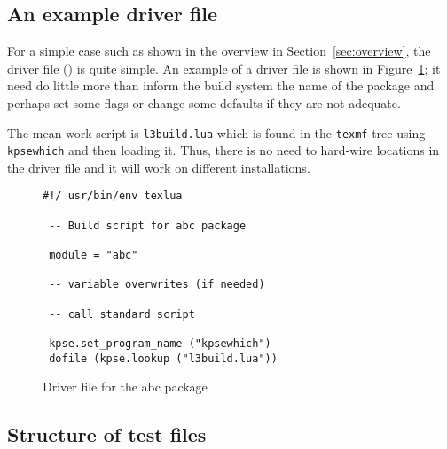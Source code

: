\documentclass[a4paper]{ltugboat}
\begin{document}
\subsection{An example driver file}
\label{sec:example}

For a simple case such as shown in the overview in
Section~\ref{sec:overview}, the driver file (\texttt{\drivername}) is
quite simple.  An example of a driver file is shown in
Figure~\ref{fig:driver}; it need do little more than inform the build
system the name of the package and perhaps set some flags or change
some defaults if they are not adequate.

The mean work script is \texttt{l3build.lua} which is found in the
\texttt{texmf} tree using \texttt{kpsewhich} and then loading
it. Thus, there is no need to hard-wire locations in the driver file
and it will work on different installations.

\begin{figure}
\begin{Verbatim}[frame=single,fontsize=\small]
#!/ usr/bin/env texlua

 -- Build script for abc package

 module = "abc"

 -- variable overwrites (if needed)

 -- call standard script

 kpse.set_program_name ("kpsewhich")
 dofile (kpse.lookup ("l3build.lua")) 
\end{Verbatim}
\caption{Driver file for the \textsf{abc} package}
\label{fig:driver}
\end{figure}


\subsection{Structure of test files}
\end{document}
